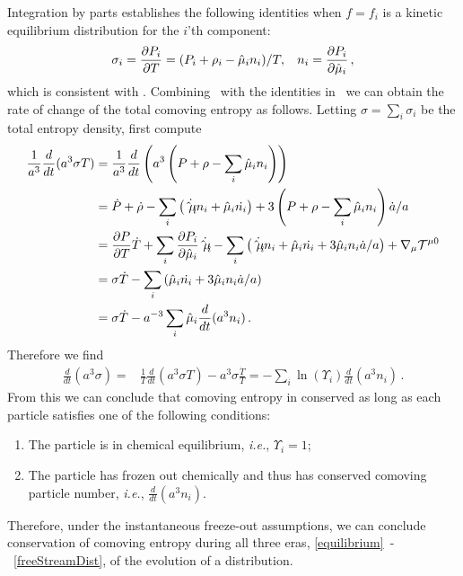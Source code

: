 Integration by parts establishes the following identities when $f=f_i$ is a kinetic equilibrium distribution for the $i$'th component:
\begin{equation}\label{identities}
\sigma_i=\frac{\partial P_i}{\partial T}=(P_i+\rho_i-\hat{\mu}_i n_i)/T, \hspace{3mm} n_i=\frac{\partial P_i}{\partial \hat{\mu}_i}\,,
\end{equation}
which is consistent with . Combining~ with the identities in~ we can obtain the rate of change of the total comoving entropy as follows. Letting $\sigma=\sum_i \sigma_i$ be the total entropy density, first compute
\begin{align}\frac{1}{a^3}\frac{d}{dt}(a^3\sigma T)&=\frac{1}{a^{3}}\frac{d}{dt}\left(a^3\left(P+\rho-\sum_i \hat{\mu}_i n_i\right)\right)\\
&=\dot{P}+\dot{\rho}-\sum_i \left(\dot{\hat{\mu}_i}n_i+\hat{\mu}_i\dot{n_i}\right)+3\left(P+\rho-\sum_i \hat{\mu}_i n_i\right)\dot{a}/a\notag\\
&=\frac{\partial P}{\partial T} \dot{T}+\sum_i\frac{\partial P_i}{\partial \hat{\mu}_i} \dot{\hat{\mu}_i}-\sum_i \left(\dot{\hat{\mu}_i}n_i+\hat{\mu}_i\dot{n_i}+3\hat{\mu}_i n_i \dot{a}/a\right)+\nabla_\mu \mathcal{T}^{\mu 0}\notag\\
&=\sigma\dot{T}-\sum_i \left(\hat{\mu}_i\dot{n_i}+3\hat{\mu}_i n_i \dot{a}/a\right)\notag\\
&=\sigma\dot{T}- a^{-3}\sum_i\hat{\mu}_i\frac{d}{dt}(a^3n_i)\,.\notag
\end{align}
Therefore we find
\begin{align}\label{S:n:eq}
\frac{d}{dt}(a^3\sigma )=&\frac{1}{T}\frac{d}{dt}(a^3\sigma T)-a^3\sigma \frac{\dot T}{T}=-\sum_i\ln(\Upsilon_i)\frac{d}{dt}(a^3n_i)\,.
\end{align}
From this we can conclude that comoving entropy in conserved as long as each particle satisfies one of the following conditions:
\begin{enumerate}
\item
The particle is in chemical equilibrium, {\it i.e.\/}, $\Upsilon_i= 1$;
\item
The particle has frozen out chemically and thus has conserved comoving particle number, {\it i.e.\/}, $\frac{d}{dt}(a^3n_i)$. 
\end{enumerate}
Therefore, under the instantaneous freeze-out assumptions, we can conclude conservation of comoving entropy during all three eras, \eqref{equilibrium}~-~\eqref{freeStreamDist}, of the evolution of a distribution. 

